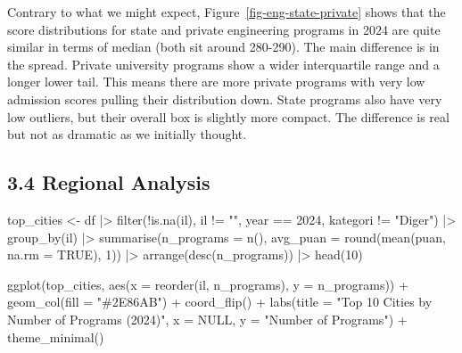 \documentclass[
  11pt,
  a4paper,
  DIV=11,
  numbers=noendperiod]{scrartcl}
\newenvironment{Shaded}{\begin{snugshade}}{\end{snugshade}}
\newcommand{\AttributeTok}[1]{\textcolor[rgb]{0.40,0.45,0.13}{#1}}
\newcommand{\ConstantTok}[1]{\textcolor[rgb]{0.56,0.35,0.01}{#1}}
\newcommand{\DecValTok}[1]{\textcolor[rgb]{0.68,0.00,0.00}{#1}}
\newcommand{\FunctionTok}[1]{\textcolor[rgb]{0.28,0.35,0.67}{#1}}
\newcommand{\NormalTok}[1]{\textcolor[rgb]{0.00,0.23,0.31}{#1}}
\newcommand{\OtherTok}[1]{\textcolor[rgb]{0.00,0.23,0.31}{#1}}
\newcommand{\SpecialCharTok}[1]{\textcolor[rgb]{0.37,0.37,0.37}{#1}}
\newcommand{\StringTok}[1]{\textcolor[rgb]{0.13,0.47,0.30}{#1}}
\begin{document}
Contrary to what we might expect, Figure~\ref{fig-eng-state-private}
shows that the score distributions for state and private engineering
programs in 2024 are quite similar in terms of median (both sit around
280-290). The main difference is in the spread. Private university
programs show a wider interquartile range and a longer lower tail. This
means there are more private programs with very low admission scores
pulling their distribution down. State programs also have very low
outliers, but their overall box is slightly more compact. The difference
is real but not as dramatic as we initially thought.

\subsection{3.4 Regional Analysis}\label{regional-analysis}

\begin{Shaded}
\begin{Highlighting}[]
\NormalTok{top\_cities }\OtherTok{\textless{}{-}}\NormalTok{ df }\SpecialCharTok{|\textgreater{}}
  \FunctionTok{filter}\NormalTok{(}\SpecialCharTok{!}\FunctionTok{is.na}\NormalTok{(il), il }\SpecialCharTok{!=} \StringTok{""}\NormalTok{, year }\SpecialCharTok{==} \DecValTok{2024}\NormalTok{, kategori }\SpecialCharTok{!=} \StringTok{"Diger"}\NormalTok{) }\SpecialCharTok{|\textgreater{}}
  \FunctionTok{group\_by}\NormalTok{(il) }\SpecialCharTok{|\textgreater{}}
  \FunctionTok{summarise}\NormalTok{(}\AttributeTok{n\_programs =} \FunctionTok{n}\NormalTok{(),}
            \AttributeTok{avg\_puan =} \FunctionTok{round}\NormalTok{(}\FunctionTok{mean}\NormalTok{(puan, }\AttributeTok{na.rm =} \ConstantTok{TRUE}\NormalTok{), }\DecValTok{1}\NormalTok{)) }\SpecialCharTok{|\textgreater{}}
  \FunctionTok{arrange}\NormalTok{(}\FunctionTok{desc}\NormalTok{(n\_programs)) }\SpecialCharTok{|\textgreater{}}
  \FunctionTok{head}\NormalTok{(}\DecValTok{10}\NormalTok{)}

\FunctionTok{ggplot}\NormalTok{(top\_cities, }\FunctionTok{aes}\NormalTok{(}\AttributeTok{x =} \FunctionTok{reorder}\NormalTok{(il, n\_programs), }\AttributeTok{y =}\NormalTok{ n\_programs)) }\SpecialCharTok{+}
  \FunctionTok{geom\_col}\NormalTok{(}\AttributeTok{fill =} \StringTok{"\#2E86AB"}\NormalTok{) }\SpecialCharTok{+}
  \FunctionTok{coord\_flip}\NormalTok{() }\SpecialCharTok{+}
  \FunctionTok{labs}\NormalTok{(}\AttributeTok{title =} \StringTok{"Top 10 Cities by Number of Programs (2024)"}\NormalTok{,}
       \AttributeTok{x =} \ConstantTok{NULL}\NormalTok{, }\AttributeTok{y =} \StringTok{"Number of Programs"}\NormalTok{) }\SpecialCharTok{+}
  \FunctionTok{theme\_minimal}\NormalTok{()}
\end{Highlighting}
\end{Shaded}
\end{document}
